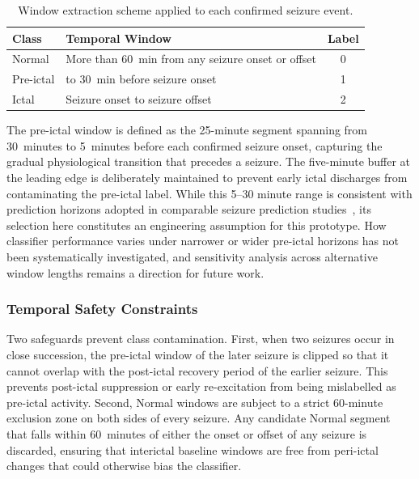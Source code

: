 \documentclass[12pt, a4paper]{report}
\begin{document}
\begin{table}[H]
  \centering
  \caption{Window extraction scheme applied to each confirmed seizure event.}
  \label{tab:window_types}
  \small
  \renewcommand{\arraystretch}{1.15}
  \begin{tabularx}{0.95\linewidth}{>{\raggedright\arraybackslash}p{2.8cm}
                                  >{\raggedright\arraybackslash}X c}
    \toprule
    \textbf{Class} & \textbf{Temporal Window} & \textbf{Label} \\
    \midrule
    Normal & More than 60~min from any seizure onset or offset & 0 \\
    Pre-ictal & 5 to 30~min before seizure onset & 1 \\
    Ictal & Seizure onset to seizure offset & 2 \\
    \bottomrule
  \end{tabularx}
\end{table}

\noindent The pre-ictal window is defined as the 25-minute segment
spanning from 30~minutes to 5~minutes before each confirmed seizure
onset, capturing the gradual physiological transition that precedes a
seizure. The five-minute buffer at the leading edge is deliberately
maintained to prevent early ictal discharges from contaminating the
pre-ictal label. While this 5--30 minute range is consistent with
prediction horizons adopted in comparable seizure prediction
studies~\cite{hu2020epileptic}, its selection here constitutes an
engineering assumption for this prototype. How classifier performance
varies under narrower or wider pre-ictal horizons has not been
systematically investigated, and sensitivity analysis across alternative
window lengths remains a direction for future work.

\subsubsection*{Temporal Safety Constraints}

Two safeguards prevent class contamination. First, when two seizures occur
in close succession, the pre-ictal window of the later seizure is clipped
so that it cannot overlap with the post-ictal recovery period of the
earlier seizure. This prevents post-ictal suppression or early
re-excitation from being mislabelled as pre-ictal activity. Second, Normal
windows are subject to a strict 60-minute exclusion zone on both sides of
every seizure. Any candidate Normal segment that falls within 60~minutes
of either the onset or offset of any seizure is discarded, ensuring that
interictal baseline windows are free from peri-ictal changes that could
otherwise bias the classifier.
\end{document}
